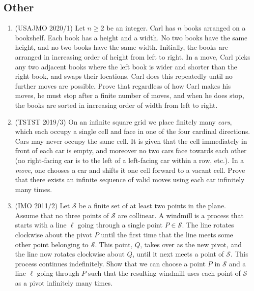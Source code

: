 \documentclass[mast]{lucky}
\begin{document}
\subsection{Other}
\begin{enumerate}
	\item (USAJMO 2020/1) Let $n \geq 2$ be an integer. Carl has $n$ books arranged on a bookshelf. Each book has a height and a width. No two books have the same height, and no two books have the same width. Initially, the books are arranged in increasing order of height from left to right. In a move, Carl picks any two adjacent books where the left book is wider and shorter than the right book, and swaps their locations. Carl does this repeatedly until no further moves are possible. Prove that regardless of how Carl makes his moves, he must stop after a finite number of moves, and when he does stop, the books are sorted in increasing order of width from left to right.

    \item (TSTST 2019/3) On an infinite square grid we place finitely many \textit{cars}, which each occupy a single cell and face in one of the four cardinal directions. Cars may never occupy the same cell. It is given that the cell immediately in front of each car is empty, and moreover no two cars face towards each other (no right-facing car is to the left of a left-facing car within a row, etc.). In a \textit{move}, one chooses a car and shifts it one cell forward to a vacant cell. Prove that there exists an infinite sequence of valid moves using each car infinitely many times.
    
    \item (IMO 2011/2) Let $\mathcal{S}$ be a finite set of at least two points in the plane. Assume that no three points of $\mathcal S$ are collinear. A windmill is a process that starts with a line $\ell$ going through a single point $P \in \mathcal S$. The line rotates clockwise about the pivot $P$ until the first time that the line meets some other point belonging to $\mathcal S$. This point, $Q$, takes over as the new pivot, and the line now rotates clockwise about $Q$, until it next meets a point of $\mathcal S$. This process continues indefinitely. Show that we can choose a point $P$ in $\mathcal S$ and a line $\ell$ going through $P$ such that the resulting windmill uses each point of $\mathcal S$ as a pivot infinitely many times.
\end{enumerate}
\end{document}
